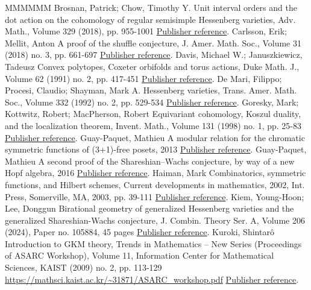\documentclass[11pt]{article}
\theoremstyle{definition}
\numberwithin{equation}{section}
\numberwithin{equation}{section}
\begin{document}
\begin{thebibliography}{MMMMMM}
 Brosnan, Patrick; Chow, Timothy Y. Unit interval orders and the dot action on the cohomology of regular semisimple Hessenberg varieties, Adv. Math., Volume 329 (2018), pp. 955-1001 \href{https://alco.centre-mersenne.org/articles/10.5802/alco.349/#BC}{Publisher reference}.
 Carlsson, Erik; Mellit, Anton A proof of the shuffle conjecture, J. Amer. Math. Soc., Volume 31 (2018) no. 3, pp. 661-697 \href{https://alco.centre-mersenne.org/articles/10.5802/alco.349/#CM}{Publisher reference}.
 Davis, Michael W.; Januszkiewicz, Tadeusz Convex polytopes, Coxeter orbifolds and torus actions, Duke Math. J., Volume 62 (1991) no. 2, pp. 417-451 \href{https://alco.centre-mersenne.org/articles/10.5802/alco.349/#DJ}{Publisher reference}.
 De Mari, Filippo; Procesi, Claudio; Shayman, Mark A. Hessenberg varieties, Trans. Amer. Math. Soc., Volume 332 (1992) no. 2, pp. 529-534 \href{https://alco.centre-mersenne.org/articles/10.5802/alco.349/#DMPS}{Publisher reference}.
 Goresky, Mark; Kottwitz, Robert; MacPherson, Robert Equivariant cohomology, Koszul duality, and the localization theorem, Invent. Math., Volume 131 (1998) no. 1, pp. 25-83 \href{https://alco.centre-mersenne.org/articles/10.5802/alco.349/#GKM}{Publisher reference}.
 Guay-Paquet, Mathieu A modular relation for the chromatic symmetric functions of (3+1)-free posets, 2013 \href{https://alco.centre-mersenne.org/articles/10.5802/alco.349/#GP}{Publisher reference}.
 Guay-Paquet, Mathieu A second proof of the Shareshian–Wachs conjecture, by way of a new Hopf algebra, 2016 \href{https://alco.centre-mersenne.org/articles/10.5802/alco.349/#GP2}{Publisher reference}.
 Haiman, Mark Combinatorics, symmetric functions, and Hilbert schemes, Current developments in mathematics, 2002, Int. Press, Somerville, MA, 2003, pp. 39-111 \href{https://alco.centre-mersenne.org/articles/10.5802/alco.349/#Hai}{Publisher reference}.
 Kiem, Young-Hoon; Lee, Donggun Birational geometry of generalized Hessenberg varieties and the generalized Shareshian-Wachs conjecture, J. Combin. Theory Ser. A, Volume 206 (2024), Paper no. 105884, 45 pages \href{https://alco.centre-mersenne.org/articles/10.5802/alco.349/#KL}{Publisher reference}.
 Kuroki, Shintarô Introduction to GKM theory, Trends in Mathematics – New Series (Proceedings of ASARC Workshop), Volume 11, Information Center for Mathematical Sciences, KAIST (2009) no. 2, pp. 113-129 \url{https://mathsci.kaist.ac.kr/~31871/ASARC_workshop.pdf} \href{https://alco.centre-mersenne.org/articles/10.5802/alco.349/#Kur}{Publisher reference}.

\end{thebibliography}
\end{document}
